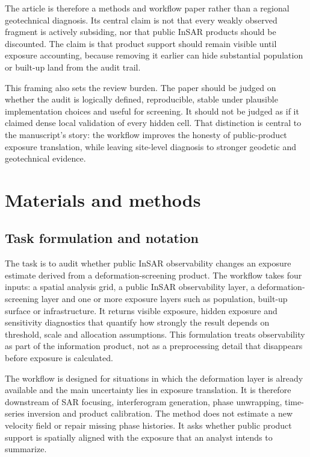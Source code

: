 \documentclass[pdflatex,sn-mathphys-ay]{sn-jnl}
\begin{document}
The article is therefore a methods and workflow paper rather than a regional geotechnical diagnosis. Its central claim is not that every weakly observed fragment is actively subsiding, nor that public InSAR products should be discounted. The claim is that product support should remain visible until exposure accounting, because removing it earlier can hide substantial population or built-up land from the audit trail.

This framing also sets the review burden. The paper should be judged on whether the audit is logically defined, reproducible, stable under plausible implementation choices and useful for screening. It should not be judged as if it claimed dense local validation of every hidden cell. That distinction is central to the manuscript's story: the workflow improves the honesty of public-product exposure translation, while leaving site-level diagnosis to stronger geodetic and geotechnical evidence.

\section{Materials and methods}

\subsection{Task formulation and notation}

The task is to audit whether public InSAR observability changes an exposure estimate derived from a deformation-screening product. The workflow takes four inputs: a spatial analysis grid, a public InSAR observability layer, a deformation-screening layer and one or more exposure layers such as population, built-up surface or infrastructure. It returns visible exposure, hidden exposure and sensitivity diagnostics that quantify how strongly the result depends on threshold, scale and allocation assumptions. This formulation treats observability as part of the information product, not as a preprocessing detail that disappears before exposure is calculated.

The workflow is designed for situations in which the deformation layer is already available and the main uncertainty lies in exposure translation. It is therefore downstream of SAR focusing, interferogram generation, phase unwrapping, time-series inversion and product calibration. The method does not estimate a new velocity field or repair missing phase histories. It asks whether public product support is spatially aligned with the exposure that an analyst intends to summarize.
\end{document}

